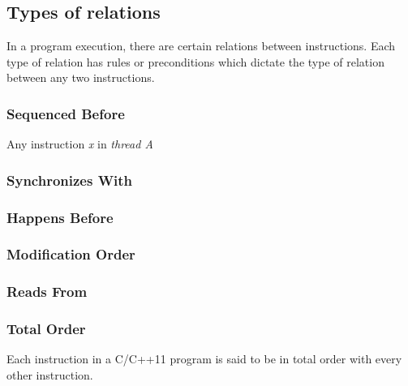 \subsection{Types of relations}
\par
In a program execution, there are certain relations between instructions. Each type of relation has rules or preconditions which dictate the type of relation between any two instructions.

\subsubsection{Sequenced Before}
\par
Any instruction \textit{x} in \textit{thread A} 
\subsubsection{Synchronizes With}
\subsubsection{Happens Before}
\subsubsection{Modification Order}
\subsubsection{Reads From}
\subsubsection{Total Order}
\par
Each instruction in a C/C++11 program is said to be in total order with every other instruction.